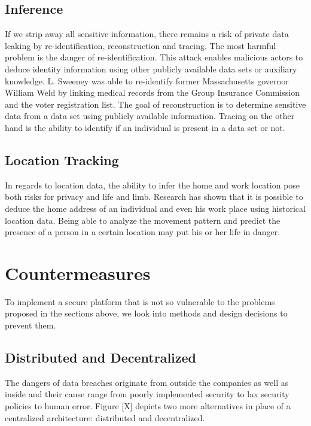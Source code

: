 \subsection{Inference}
If we strip away all sensitive information, there remains a risk of private data leaking by re-identification, reconstruction and tracing. The most harmful problem is the danger of re-identification. This attack enables malicious actors to deduce identity information using other publicly available data sets or auxiliary knowledge. L. Sweeney was able to re-identify former Massachusetts governor William Weld by linking medical records from the Group Insurance Commission and the voter registration list.
 The goal of reconstruction is to determine sensitive data from a data set using publicly available information. 
Tracing on the other hand is the ability to identify if an individual is present in a data set or not.

\subsection{Location Tracking}
In regards to location data, the ability to infer the home and work location pose both risks for privacy and life and limb. Research has shown that it is possible to deduce the home address of an individual and even his work place using historical location data.
 Being able to analyze the movement pattern and predict the presence of a person in a certain location may put his or her life in danger. 

\section{Countermeasures}
To implement a secure platform that is not so vulnerable to the problems proposed in the sections above, we look into methods and design decisions to prevent them.
\subsection{Distributed and Decentralized}
The dangers of data breaches originate from outside the companies as well as inside and their cause range from poorly implemented security to lax security policies to human error. 
Figure [X] depicts two more alternatives in place of a centralized architecture: distributed and decentralized.

